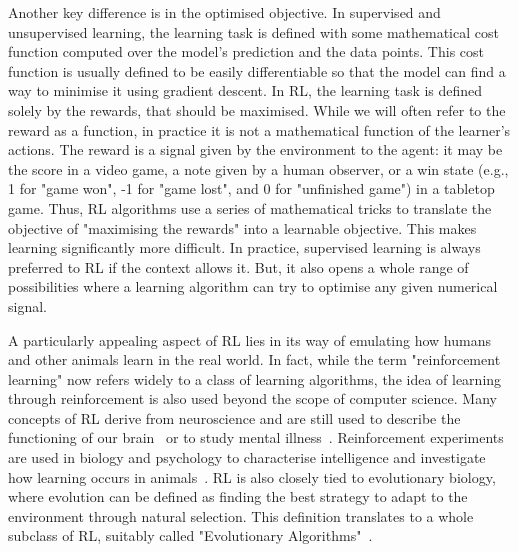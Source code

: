 Another key difference is in the optimised objective. In supervised and unsupervised learning, the learning task is defined with some mathematical cost function computed over the model's prediction and the data points. This cost function is usually defined to be easily differentiable so that the model can find a way to minimise it using gradient descent. In RL, the learning task is defined solely by the rewards, that should be maximised. While we will often refer to the reward as a function, in practice it is not a mathematical function of the learner's actions. The reward is a signal given by the environment to the agent: it may be the score in a video game, a note given by a human observer, or a win state (e.g., 1 for "game won", -1 for "game lost", and 0 for "unfinished game") in a tabletop game. Thus, RL algorithms use a series of mathematical tricks to translate the objective of "maximising the rewards" into a learnable objective. This makes learning significantly more difficult. In practice, supervised learning is always preferred to RL if the context allows it. But, it also opens a whole range of possibilities where a learning algorithm can try to optimise any given numerical signal. 

A particularly appealing aspect of RL lies in its way of emulating how humans and other animals learn in the real world. In fact, while the term "reinforcement learning" now refers widely to a class of learning algorithms, the idea of learning through reinforcement is also used beyond the scope of computer science. Many concepts of RL derive from neuroscience and are still used to describe the functioning of our brain~\citep{Schultz1997_Neuro, Friston2010_FreeEnergy} or to study mental illness~\citep{Montague2012_Psych}. Reinforcement experiments are used in biology and psychology to characterise intelligence and investigate how learning occurs in animals~\citep{Rescorla1972_Pavlovian, Gardner1984_Chimpanzee, Brembs2010_FreeWill}. RL is also closely tied to evolutionary biology, where evolution can be defined as finding the best strategy to adapt to the environment through natural selection. This definition translates to a whole subclass of RL, suitably called "Evolutionary Algorithms"~\citep{Eiben2003_Evo}. 

